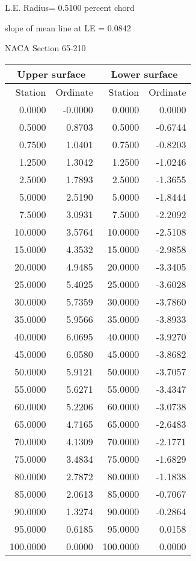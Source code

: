 \documentclass[11pt]{book}
\begin{document}
L.E. Radius=  0.5100 percent chord


 slope of mean line at LE =  0.0842
 \newpage
  \label{s65-210}
 \begin{Large}
 NACA Section 65-210
 \end{Large}
  
 \vspace{8mm}
 \begin{tabular}{|r|r|r|r|} \hline 
 \multicolumn{2}{|c|}{Upper surface} & \multicolumn{2}{|c|}{Lower surface} \\
 \hline
 Station & Ordinate & Station & Ordinate \\
 \hline
0.0000 & -0.0000 & 0.0000 & 0.0000 \\
0.5000 & 0.8703 & 0.5000 & -0.6744 \\
0.7500 & 1.0401 & 0.7500 & -0.8203 \\
1.2500 & 1.3042 & 1.2500 & -1.0246 \\
2.5000 & 1.7893 & 2.5000 & -1.3655 \\
5.0000 & 2.5190 & 5.0000 & -1.8444 \\
7.5000 & 3.0931 & 7.5000 & -2.2092 \\
10.0000 & 3.5764 & 10.0000 & -2.5108 \\
15.0000 & 4.3532 & 15.0000 & -2.9858 \\
20.0000 & 4.9485 & 20.0000 & -3.3405 \\
25.0000 & 5.4025 & 25.0000 & -3.6028 \\
30.0000 & 5.7359 & 30.0000 & -3.7860 \\
35.0000 & 5.9566 & 35.0000 & -3.8933 \\
40.0000 & 6.0695 & 40.0000 & -3.9270 \\
45.0000 & 6.0580 & 45.0000 & -3.8682 \\
50.0000 & 5.9121 & 50.0000 & -3.7057 \\
55.0000 & 5.6271 & 55.0000 & -3.4347 \\
60.0000 & 5.2206 & 60.0000 & -3.0738 \\
65.0000 & 4.7165 & 65.0000 & -2.6483 \\
70.0000 & 4.1309 & 70.0000 & -2.1771 \\
75.0000 & 3.4834 & 75.0000 & -1.6829 \\
80.0000 & 2.7872 & 80.0000 & -1.1838 \\
85.0000 & 2.0613 & 85.0000 & -0.7067 \\
90.0000 & 1.3274 & 90.0000 & -0.2864 \\
95.0000 & 0.6185 & 95.0000 & 0.0158 \\
100.0000 & 0.0000 & 100.0000 & 0.0000 \\
 \hline 
 \end{tabular}
\end{document}
